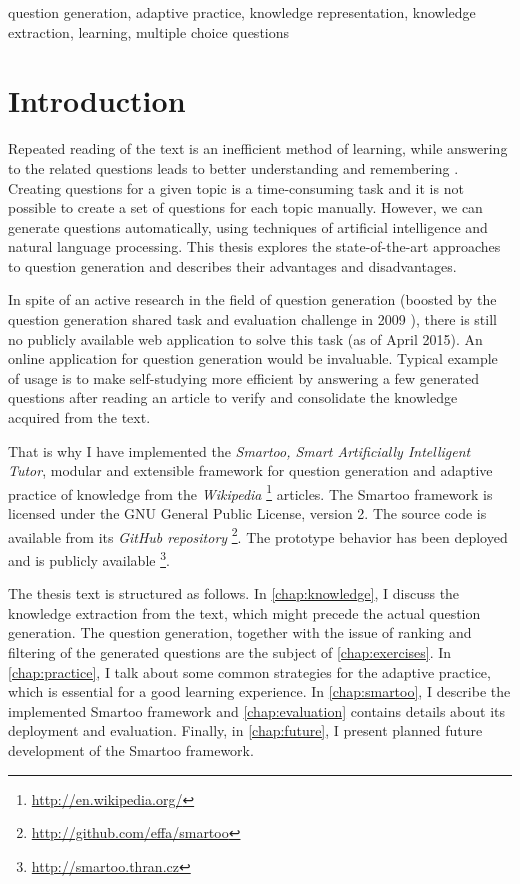 \documentclass[12pt, twoside]{fithesis2}
\renewcommand{\_}{\leavevmode \kern0.07em\vbox{\hrule width0.4em}}
\newcounter{choice}
\begin{document}
\begin{ThesisKeyWords}
question generation, adaptive practice,
knowledge representation, knowledge extraction,
learning,
multiple choice questions
\end{ThesisKeyWords}

\MainMatter
\tableofcontents

\chapter{Introduction}
\label{chap:intro}

Repeated reading of the text is an inefficient method of learning,
while answering to the related questions leads to better understanding and remembering \cite{edu-improve}.
Creating questions for a given topic is a time-consuming task
and it is not possible to create a set of questions for each topic manually.
However, we can generate questions automatically, using techniques of artificial intelligence and natural language processing.
This thesis explores the state-of-the-art approaches to question generation and describes their advantages and disadvantages.

In spite of an active research in the field of question generation
(boosted by the question generation shared task and evaluation challenge in 2009 \cite{shared-task2009}),
there is still no publicly available web application to solve this task (as of April 2015).
An online application for question generation would be invaluable.
Typical example of usage is to make self-studying more efficient by answering a few generated questions after reading an article to verify and consolidate the knowledge acquired from the text.

That is why I have implemented the \textit{Smartoo, Smart Artificially Intelligent Tutor}, modular and extensible framework for question generation and adaptive practice
of knowledge from the \emph{Wikipedia}%
\footnote{\url{http://en.wikipedia.org/}}
articles.
The Smartoo framework is licensed under the GNU General Public License, version 2.
The source code is available from its \textit{GitHub repository}%
\footnote{\url{http://github.com/effa/smartoo}}.
The prototype behavior has been deployed and is publicly available%
\footnote{\url{http://smartoo.thran.cz}}.

The thesis text is structured as follows.
In \autoref{chap:knowledge}, I discuss the knowledge extraction from the text,
which might precede the actual question generation.
The question generation, together with the issue of ranking and filtering of the generated questions are the subject of \autoref{chap:exercises}.
In \autoref{chap:practice}, I talk about some common strategies for the adaptive practice, which is essential for a good learning experience.
In \autoref{chap:smartoo}, I describe the implemented Smartoo framework
and \autoref{chap:evaluation} contains details about its deployment and evaluation.
Finally, in \autoref{chap:future}, I present planned future development of the Smartoo framework.
\end{document}
